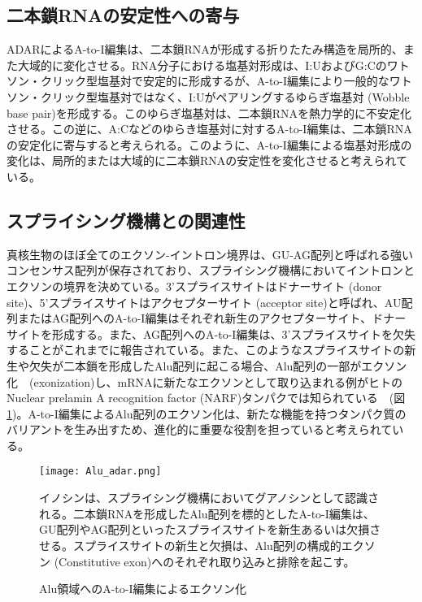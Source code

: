 \subsection{二本鎖RNAの安定性への寄与}
ADARによるA-to-I編集は、二本鎖RNAが形成する折りたたみ構造を局所的、また大域的に変化させる。RNA分子における塩基対形成は、I:UおよびG:Cのワトソン・クリック型塩基対で安定的に形成するが、A-to-I編集により一般的なワトソン・クリック型塩基対ではなく、I:Uがペアリングするゆらぎ塩基対 (Wobble base pair)を形成する。このゆらぎ塩基対は、二本鎖RNAを熱力学的に不安定化させる。この逆に、A:Cなどのゆらき塩基対に対するA-to-I編集は、二本鎖RNAの安定化に寄与すると考えられる。このように、A-to-I編集による塩基対形成の変化は、局所的または大域的に二本鎖RNAの安定性を変化させると考えられている。


\subsection{スプライシング機構との関連性}
真核生物のほぼ全てのエクソン-イントロン境界は、GU-AG配列と呼ばれる強いコンセンサス配列が保存されており、スプライシング機構においてイントロンとエクソンの境界を決めている。3'スプライスサイトはドナーサイト (donor site)、5'スプライスサイトはアクセプターサイト (acceptor site)と呼ばれ、AU配列またはAG配列へのA-to-I編集はそれぞれ新生のアクセプターサイト、ドナーサイトを形成する。また、AG配列へのA-to-I編集は、3'スプライスサイトを欠失することがこれまでに報告されている。また、このようなスプライスサイトの新生や欠失が二本鎖を形成したAlu配列に起こる場合、Alu配列の一部がエクソン化　(exonization)し、mRNAに新たなエクソンとして取り込まれる例がヒトのNuclear prelamin A recognition factor (NARF)タンパクでは知られている　(図\ref{fig:Alu_adar})。A-to-I編集によるAlu配列のエクソン化は、新たな機能を持つタンパク質のバリアントを生み出すため、進化的に重要な役割を担っていると考えられている。

\begin{figure}[!h]
	\begin{center}
		\texttt{[image: Alu\_adar.png]}
	\end{center}
	\caption{Alu領域へのA-to-I編集によるエクソン化}
	\begin{flushleft}
		\small{イノシンは、スプライシング機構においてグアノシンとして認識される。二本鎖RNAを形成したAlu配列を標的としたA-to-I編集は、GU配列やAG配列といったスプライスサイトを新生あるいは欠損させる。スプライスサイトの新生と欠損は、Alu配列の構成的エクソン (Constitutive exon)へのそれぞれ取り込みと排除を起こす。}
	\end{flushleft}
	\label{fig:Alu_adar}
\end{figure}

